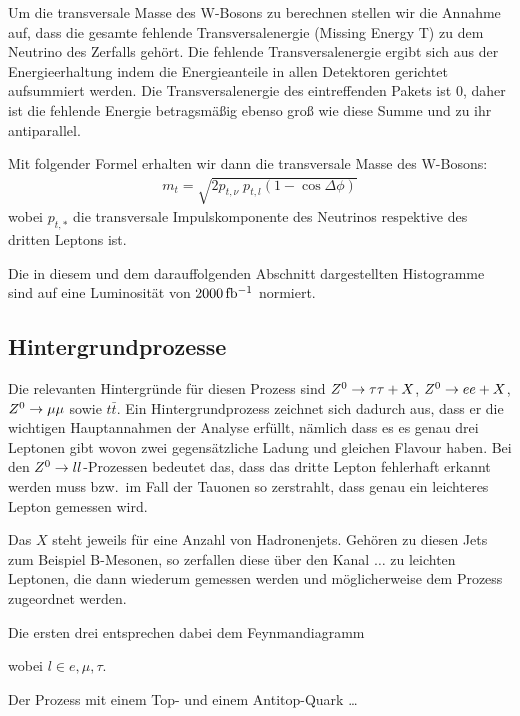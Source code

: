 Um die transversale Masse des W-Bosons zu berechnen stellen wir die Annahme auf,
dass die gesamte fehlende Transversalenergie (Missing Energy T) zu dem Neutrino
des Zerfalls gehört. Die fehlende Transversalenergie ergibt sich aus der
Energieerhaltung indem die Energieanteile in allen Detektoren gerichtet
aufsummiert werden. Die Transversalenergie des eintreffenden Pakets ist $0$,
daher ist die fehlende Energie betragsmäßig ebenso groß wie diese Summe und zu
ihr antiparallel.

Mit folgender Formel erhalten wir dann die transversale Masse des W-Bosons: 
\begin{align}
  m_t = \sqrt{2 p_{t,\nu}\; p_{t,l} (1 - \cos{\Delta\phi})}
  \label{eqn:trans}
\end{align}
wobei $p_{t,*}$ die transversale Impulskomponente des Neutrinos respektive des
dritten Leptons ist.

Die in diesem und dem darauffolgenden Abschnitt dargestellten Histogramme sind
auf eine Luminosität von $\unit[2000]{fb^{-1}}$ normiert.

\subsection{Hintergrundprozesse}
Die relevanten Hintergründe für diesen Prozess sind $Z^0\to\tau\tau + X$, $Z^0\to e
e + X$, $Z^0\to\mu\mu$ sowie $t\bar{t}$. Ein Hintergrundprozess zeichnet sich
dadurch aus, dass er die wichtigen Hauptannahmen der Analyse erfüllt, nämlich
dass es es genau drei Leptonen gibt wovon zwei gegensätzliche Ladung und
gleichen Flavour haben. Bei den $Z^0\to l l$-Prozessen bedeutet das, dass das
dritte Lepton fehlerhaft erkannt werden muss bzw.\ im Fall der Tauonen so
zerstrahlt, dass genau ein leichteres Lepton gemessen wird.

Das $X$ steht jeweils für eine Anzahl von Hadronenjets. Gehören zu diesen Jets
zum Beispiel B-Mesonen, so zerfallen diese über den Kanal $\dots$ zu leichten
Leptonen, die dann wiederum gemessen werden und möglicherweise dem Prozess
zugeordnet werden.


Die ersten drei entsprechen dabei dem
Feynmandiagramm
\begin{figure}[h!]
  \begin{center}
%    
  \end{center}
\end{figure}
wobei $l \in {e,\mu,\tau}$. 

Der Prozess mit einem Top- und einem Antitop-Quark \dots

